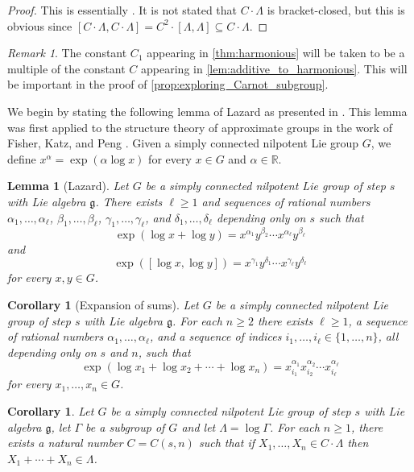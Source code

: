 \documentclass[11pt]{article}
\numberwithin{equation}{section}
\theoremstyle{plain}
\newtheorem{lemma}[thm]{Lemma}
\newtheorem{corollary}[thm]{Corollary}
\theoremstyle{definition}
\theoremstyle{remark}
\newtheorem{remark}{Remark}[section]
\numberwithin{equation}{section}
\newcommand{\R}{\mathbb R}
\numberwithin{equation}{section}
\begin{document}
\begin{proof}
This is essentially \cite[Lemma 4.3]{MR3877012}. It is not stated that $C\cdot \Lambda$ is bracket-closed, but this is obvious since $[C \cdot\Lambda,C\cdot\Lambda]= C^2 \cdot [\Lambda,\Lambda] \subseteq C\cdot \Lambda$.
\end{proof}

\begin{remark}\label{rmk:C_divides_C1}
The constant $C_1$ appearing in \cref{thm:harmonious} will be taken to be a multiple of the constant $C$ appearing in \cref{lem:additive_to_harmonious}. This will be important in the proof of \cref{prop:exploring_Carnot_subgroup}.
\end{remark}


We begin by stating the following lemma of Lazard \cite{lazard1954groupes} as presented in \cite[Lemmas 5.2 and 5.3]{breuillard2011approximate}. This lemma was first applied to the structure theory of approximate groups in the work of Fisher, Katz, and Peng \cite{fisher2009freiman}. Given a simply connected nilpotent Lie group $G$, we define $x^\alpha=\exp(\alpha \log x)$ for every $x\in G$ and $\alpha \in \R$.

\begin{lemma}[Lazard]
Let $G$ be a simply connected nilpotent Lie group of step $s$ with Lie algebra $\mathfrak{g}$. There exists $\ell\geq 1$ and sequences of rational numbers $\alpha_1,\ldots,\alpha_\ell$, $\beta_1,\ldots,\beta_\ell$, $\gamma_1,\ldots,\gamma_\ell$, and $\delta_1,\ldots,\delta_\ell$ depending only on $s$ such that
\[
\exp(\log x+\log y)=x^{\alpha_1}y^{\beta_2}\cdots x^{\alpha_\ell} y^{\beta_\ell}
\]
and
\[
\exp([\log x,\log y])=x^{\gamma_1}y^{\delta_1}\cdots x^{\gamma_\ell} y^{\delta_\ell}
\]
for every $x,y \in G$.
\end{lemma}

\begin{corollary}[Expansion of sums]
\label{cor:expansion_of_sums}
Let $G$ be a simply connected nilpotent Lie group of step $s$ with Lie algebra $\mathfrak{g}$. For each $n\geq 2$ there exists $\ell\geq 1$, a sequence of rational numbers $\alpha_1,\ldots,\alpha_\ell$, and a sequence of indices $i_1,\ldots,i_\ell \in \{1,\ldots,n\}$, all depending only on $s$ and $n$, such that
\[
\exp(\log x_1+\log x_2 + \cdots + \log x_n )=x^{\alpha_1}_{i_1} x^{\alpha_2}_{i_2}\cdots x^{\alpha_\ell}_{i_\ell}
\]
for every $x_1,\ldots,x_n \in G$.
\end{corollary}

\begin{corollary}
\label{cor:expansion_of_sums2}
Let $G$ be a simply connected nilpotent Lie group of step $s$ with Lie algebra $\mathfrak{g}$, let $\Gamma$ be a subgroup of $G$ and let $\Lambda = \log \Gamma$. For each $n\geq 1$, there exists a natural number $C=C(s,n)$ such that if $X_1,\ldots,X_n \in C\cdot \Lambda$ then $X_1+\cdots+X_n \in \Lambda$.
\end{corollary}
\end{document}

